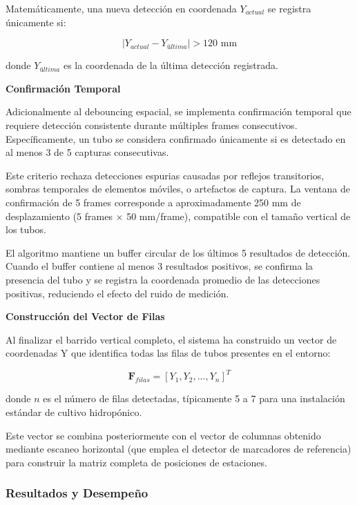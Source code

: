 Matemáticamente, una nueva detección en coordenada $Y_{actual}$ se registra únicamente si:

\begin{equation}
|Y_{actual} - Y_{última}| > 120 \text{ mm}
\end{equation}

donde $Y_{última}$ es la coordenada de la última detección registrada.

\textbf{Confirmación Temporal}

Adicionalmente al debouncing espacial, se implementa confirmación temporal que requiere detección consistente durante múltiples frames consecutivos. Específicamente, un tubo se considera confirmado únicamente si es detectado en al menos 3 de 5 capturas consecutivas.

Este criterio rechaza detecciones espurias causadas por reflejos transitorios, sombras temporales de elementos móviles, o artefactos de captura. La ventana de confirmación de 5 frames corresponde a aproximadamente 250 mm de desplazamiento (5 frames × 50 mm/frame), compatible con el tamaño vertical de los tubos.

El algoritmo mantiene un buffer circular de los últimos 5 resultados de detección. Cuando el buffer contiene al menos 3 resultados positivos, se confirma la presencia del tubo y se registra la coordenada promedio de las detecciones positivas, reduciendo el efecto del ruido de medición.

\textbf{Construcción del Vector de Filas}

Al finalizar el barrido vertical completo, el sistema ha construido un vector de coordenadas Y que identifica todas las filas de tubos presentes en el entorno:

\begin{equation}
\mathbf{F}_{filas} = [Y_1, Y_2, ..., Y_n]^T
\end{equation}

donde $n$ es el número de filas detectadas, típicamente 5 a 7 para una instalación estándar de cultivo hidropónico.

Este vector se combina posteriormente con el vector de columnas obtenido mediante escaneo horizontal (que emplea el detector de marcadores de referencia) para construir la matriz completa de posiciones de estaciones.

\subsubsection{Resultados y Desempeño}

